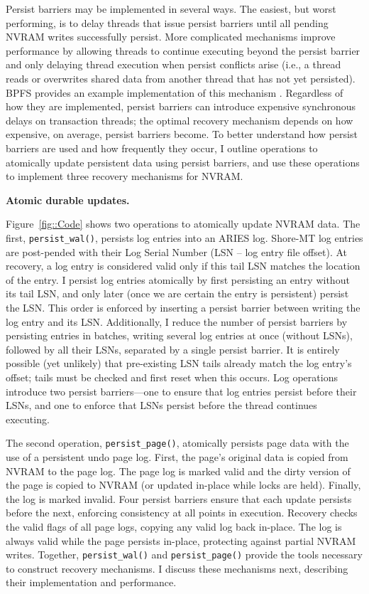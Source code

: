 Persist barriers may be implemented in several ways.
The easiest, but worst performing, is to delay threads that issue persist barriers until all pending NVRAM writes successfully persist.
More complicated mechanisms improve performance by allowing threads to continue executing beyond the persist barrier and only delaying thread execution when persist conflicts arise (i.e., a thread reads or overwrites shared data from another thread that has not yet persisted).
BPFS provides an example implementation of this mechanism \cite{ConditNightingale09}.
Regardless of how they are implemented, persist barriers can introduce expensive synchronous delays on transaction threads; the optimal recovery mechanism depends on how expensive, on average, persist barriers become.
To better understand how persist barriers are used and how frequently they occur, I outline operations to atomically update persistent data using persist barriers, and use these operations to implement three recovery mechanisms for NVRAM.

\textbf{Atomic durable updates.}

Figure~\ref{fig::Code} shows two operations to atomically update NVRAM data.
The first, \texttt{persist\_wal()}, persists log entries into an ARIES log.
Sho\-re-MT log entries are post-pended with their Log Serial Number (LSN -- log entry file offset).
At recovery, a log entry is considered valid only if this tail LSN matches the location of the entry.
I persist log entries atomically by first persisting an entry without its tail LSN, and only later (once we are certain the entry is persistent) persist the LSN.
This order is enforced by inserting a persist barrier between writing the log entry and its LSN.
Additionally, I reduce the number of persist barriers by persisting entries in batches, writing several log entries at once (without LSNs), followed by all their LSNs, separated by a single persist barrier.
It is entirely possible (yet unlikely) that pre-existing LSN tails already match the log entry's offset; tails must be checked and first reset when this occurs.
Log operations introduce two persist barriers---one to ensure that log entries persist before their LSNs, and one to enforce that LSNs persist before the thread continues executing.

The second operation, \texttt{persist\_page()}, atomically persists page data with the use of a persistent undo page log.
First, the page's original data is copied from NVRAM to the page log.
The page log is marked valid and the dirty version of the page is copied to NVRAM (or updated in-place while locks are held).
Finally, the log is marked invalid.
Four persist barriers ensure that each update persists before the next, enforcing consistency at all points in execution.
Recovery checks the valid flags of all page logs, copying any valid log back in-place.
The log is always valid while the page persists in-place, protecting against partial NVRAM writes.
Together, \texttt{persist\_wal()} and \texttt{persist\_page()} provide the tools necessary to construct recovery mechanisms.
I discuss these mechanisms next, describing their implementation and performance.

